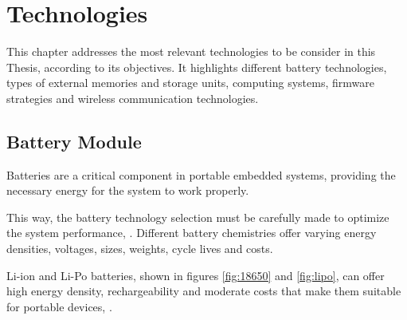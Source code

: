 \chapter{Technologies}
\label{chap:Chapter3}

This chapter addresses the most relevant technologies to be consider in this Thesis, according to its objectives.
It highlights different battery technologies, types of external memories and storage units, computing systems, firmware strategies and wireless communication technologies.

\section{Battery Module}

Batteries are a critical component in portable embedded systems, providing the necessary energy for the system to work properly.

This way, the battery technology selection must be carefully made to optimize the system performance, \cite{BATT3}.
Different battery chemistries offer varying energy densities, voltages, sizes, weights, cycle lives and costs.

\gls{Li-ion} and \gls{Li-Po} batteries, shown in figures \ref{fig:18650} and \ref{fig:lipo}, can offer high energy density, rechargeability and moderate costs that make them suitable for portable devices, \cite{BATT7}.


